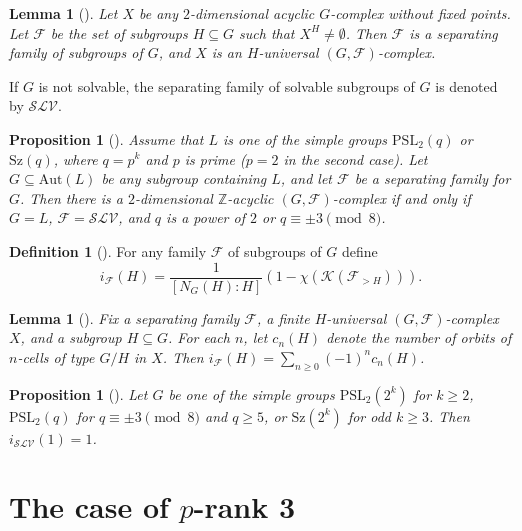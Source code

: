 \documentclass[11pt,twoside,reqno]{amsart}
\theoremstyle{plain}
\newtheorem{lemma}[theorem]{Lemma}
\newtheorem{proposition}[theorem]{Proposition}
\theoremstyle{definition}
\newtheorem{definition}[theorem]{Definition}
\theoremstyle{remark}
\def\Aut{\mathrm{Aut}}
\def\F{\mathcal{F}}
\def\K{\mathcal{K}}
\def\Z{\mathbb{Z}}
\def\SLV{\mathcal{SLV}}
\def\PSL{\mathrm{PSL}}
\def\Sz{\mathrm{Sz}}
\begin{document}
\begin{lemma}[{\cite[Lemma 1.2]{OS}}]\label{lemma1.2}
 Let $X$ be any $2$-dimensional acyclic $G$-complex without fixed points. Let $\F$ be the set of subgroups $H\subseteq G$ such that $X^H\neq \emptyset$. Then $\F$ is a separating family of subgroups of $G$, and $X$ is an $H$-universal $(G,\F)$-complex.
\end{lemma}

If $G$ is not solvable, the separating family of solvable subgroups of $G$ is denoted by $\SLV$.

\begin{proposition}[{\cite[Proposition 6.4]{OS}}]\label{proposition6.4}
 Assume that $L$ is one of the simple groups $\PSL_2(q)$ or $\Sz(q)$, where $q=p^k$ and $p$ is prime ($p=2$ in the second case). Let $G\subseteq\Aut(L)$ be any subgroup containing $L$, and let $\F$ be a separating family for $G$. Then there is a $2$-dimensional $\Z$-acyclic $(G,\F)$-complex if and only if $G=L$, $\F=\SLV$, and $q$ is a power of $2$ or $q\equiv \pm 3 \pmod 8$. 
\end{proposition}

\begin{definition}[{\cite[Definition 2.1]{OS}}]
 For any family $\F$ of subgroups of $G$ define 
 $$i_\F(H)=\frac{1}{[N_G(H):H]}(1-\chi(\K(\F_{>H}))).$$
\end{definition}

\begin{lemma}[{\cite[Lemma 2.3]{OS}}]\label{lemma2.3}
 Fix a separating family $\F$, a finite $H$-universal $(G,\F)$-complex $X$, and a subgroup $H\subseteq G$. For each $n$, let $c_n(H)$ denote the number of orbits of $n$-cells of type $G/H$ in $X$. Then $i_\F(H)=\sum_{n\geq 0} (-1)^nc_n(H)$.
\end{lemma}

\begin{proposition}[{\cite[Tables 2,3,4]{OS}}]\label{indices}
 Let $G$ be one of the simple groups $\PSL_2(2^k)$ for $k\geq 2$, $\PSL_2(q)$ for $q\equiv \pm 3 \pmod 8$ and $q\geq 5$, or $\Sz(2^k)$ for odd $k\geq 3$. Then $i_\SLV( 1 ) = 1$.
\end{proposition}



\section[The case of p-rank 3]{The case of $p$-rank 3}

\end{document}
